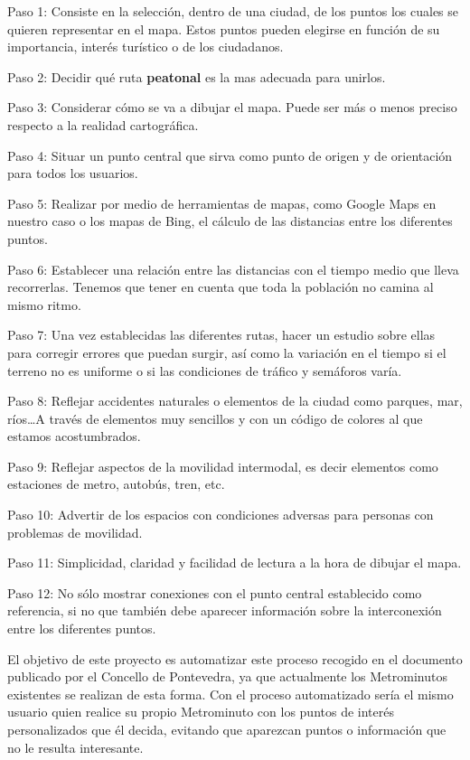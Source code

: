 \begin{steps}
	\item Paso 1: Consiste en la selección, dentro de una ciudad, de los puntos los cuales se quieren representar en el mapa. Estos puntos pueden elegirse en función de su importancia, interés turístico o de los ciudadanos.
	\item Paso 2: Decidir qué ruta \textbf{peatonal} es la mas adecuada para unirlos.
	\item Paso 3: Considerar cómo se va a dibujar el mapa. Puede ser más o menos preciso respecto a la realidad cartográfica.
	\item Paso 4: Situar un punto central que sirva como punto de origen y de orientación para todos los usuarios.
	\item Paso 5: Realizar por medio de herramientas de mapas, como Google Maps en nuestro caso o los mapas de Bing, el cálculo de las distancias entre los diferentes puntos.
	\item Paso 6: Establecer una relación entre las distancias con el tiempo medio que lleva recorrerlas. Tenemos que tener en cuenta que toda la población no camina al mismo ritmo.
	\item Paso 7: Una vez establecidas las diferentes rutas, hacer un estudio sobre ellas para corregir errores que puedan surgir, así como la variación en el tiempo si el terreno no es uniforme o si las condiciones de tráfico y semáforos varía.
	\item Paso 8: Reflejar accidentes naturales o elementos de la ciudad como parques, mar, ríos\dots A través de elementos muy sencillos y con un código de colores al que estamos acostumbrados.
	\item Paso 9:  Reflejar aspectos de la movilidad intermodal, es decir elementos como estaciones de metro, autobús, tren, etc. 
	\item Paso 10: Advertir de los espacios con condiciones adversas para personas con problemas de movilidad.
	\item Paso 11: Simplicidad, claridad y facilidad de lectura a la hora de dibujar el mapa.
	\item Paso 12: No sólo mostrar conexiones con el punto central establecido como referencia, si no que también debe aparecer información sobre la interconexión entre los diferentes puntos.
\end{steps}

El objetivo de este proyecto es automatizar este proceso recogido en el documento publicado por el Concello de Pontevedra\cite{metrominuto}, ya que actualmente los Metrominutos existentes se realizan de esta forma. Con el proceso automatizado sería el mismo usuario quien realice su propio Metrominuto con los puntos de interés personalizados que él decida, evitando que aparezcan puntos o información que no le resulta interesante.


